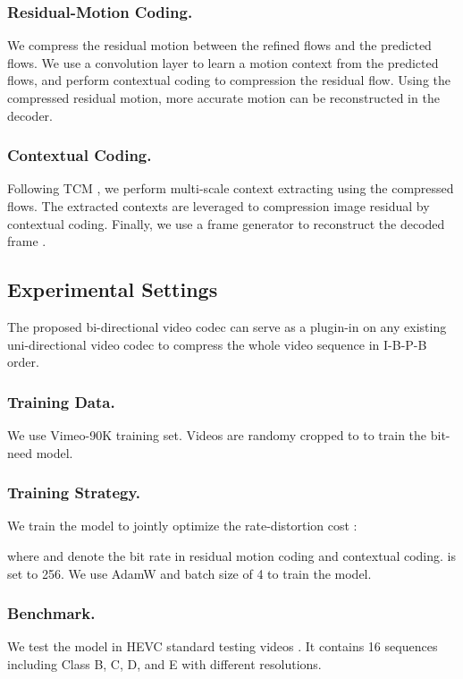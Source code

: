 \documentclass[sigconf]{acmart}
\begin{document}
\subsubsection{Residual-Motion Coding.} We compress the residual motion between the refined flows and the predicted flows. We use a convolution layer to learn a motion context  from the predicted flows, and perform contextual coding \cite{li2021deep} to compression the residual flow. Using the compressed residual motion, more accurate motion  can be reconstructed in the decoder.

\subsubsection{Contextual Coding.} Following TCM \cite{sheng2021temporal}, we perform multi-scale context extracting using the compressed flows. The extracted contexts  are leveraged to compression image residual by contextual coding. Finally, we use a frame generator to reconstruct the decoded frame .



\subsection{Experimental Settings}

The proposed bi-directional video codec can serve as a plugin-in on any existing uni-directional video codec to compress the whole video sequence in I-B-P-B order. 

\subsubsection{Training Data.} We use Vimeo-90K\cite{xue2019video} training set. Videos are randomy cropped to  to train the bit-need model.

\subsubsection{Training Strategy.} We train the model to jointly optimize the rate-distortion cost : 

where  and  denote the bit rate in residual motion coding and contextual coding.  is set to 256. We use AdamW\cite{loshchilov2018fixing} and batch size of 4 to train the model.

\subsubsection{Benchmark.} We test the model in HEVC standard testing videos \cite{sullivan2012overview}. It contains 16 sequences including Class B, C, D, and E with different resolutions.
\end{document}
